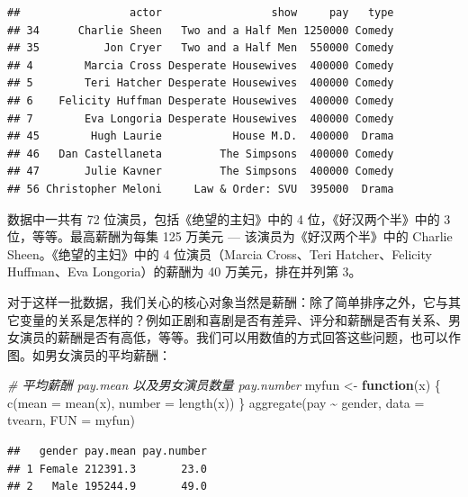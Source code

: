 \documentclass[
  b5paper,
  UTF8,twoside]{book}
\newenvironment{Shaded}{\begin{snugshade}}{\end{snugshade}}
\newcommand{\AttributeTok}[1]{\textcolor[rgb]{0.77,0.63,0.00}{#1}}
\newcommand{\CommentTok}[1]{\textcolor[rgb]{0.56,0.35,0.01}{\textit{#1}}}
\newcommand{\ControlFlowTok}[1]{\textcolor[rgb]{0.13,0.29,0.53}{\textbf{#1}}}
\newcommand{\FunctionTok}[1]{\textcolor[rgb]{0.00,0.00,0.00}{#1}}
\newcommand{\NormalTok}[1]{#1}
\newcommand{\OtherTok}[1]{\textcolor[rgb]{0.56,0.35,0.01}{#1}}
\newcommand{\SpecialCharTok}[1]{\textcolor[rgb]{0.00,0.00,0.00}{#1}}
\begin{document}
\begin{verbatim}
##                 actor                 show     pay   type
## 34      Charlie Sheen   Two and a Half Men 1250000 Comedy
## 35          Jon Cryer   Two and a Half Men  550000 Comedy
## 4        Marcia Cross Desperate Housewives  400000 Comedy
## 5        Teri Hatcher Desperate Housewives  400000 Comedy
## 6    Felicity Huffman Desperate Housewives  400000 Comedy
## 7        Eva Longoria Desperate Housewives  400000 Comedy
## 45        Hugh Laurie           House M.D.  400000  Drama
## 46   Dan Castellaneta         The Simpsons  400000 Comedy
## 47       Julie Kavner         The Simpsons  400000 Comedy
## 56 Christopher Meloni     Law & Order: SVU  395000  Drama
\end{verbatim}

数据中一共有 72 位演员，包括《绝望的主妇》中的 4 位，《好汉两个半》中的 3 位，等等。最高薪酬为每集 125 万美元 --- 该演员为《好汉两个半》中的 Charlie Sheen。《绝望的主妇》中的 4 位演员（Marcia Cross、Teri Hatcher、Felicity Huffman、Eva Longoria）的薪酬为 40 万美元，排在并列第 3。

对于这样一批数据，我们关心的核心对象当然是薪酬：除了简单排序之外，它与其它变量的关系是怎样的？例如正剧和喜剧是否有差异、评分和薪酬是否有关系、男女演员的薪酬是否有高低，等等。我们可以用数值的方式回答这些问题，也可以作图。如男女演员的平均薪酬：

\begin{Shaded}
\begin{Highlighting}[]
\CommentTok{\# 平均薪酬 pay.mean 以及男女演员数量 pay.number}
\NormalTok{myfun }\OtherTok{\textless{}{-}} \ControlFlowTok{function}\NormalTok{(x) \{}
 \FunctionTok{c}\NormalTok{(}\AttributeTok{mean =} \FunctionTok{mean}\NormalTok{(x), }\AttributeTok{number =} \FunctionTok{length}\NormalTok{(x))}
\NormalTok{\}}
\FunctionTok{aggregate}\NormalTok{(pay }\SpecialCharTok{\textasciitilde{}}\NormalTok{ gender, }\AttributeTok{data =}\NormalTok{ tvearn, }\AttributeTok{FUN =}\NormalTok{ myfun)}
\end{Highlighting}
\end{Shaded}

\begin{verbatim}
##   gender pay.mean pay.number
## 1 Female 212391.3       23.0
## 2   Male 195244.9       49.0
\end{verbatim}
\end{document}

